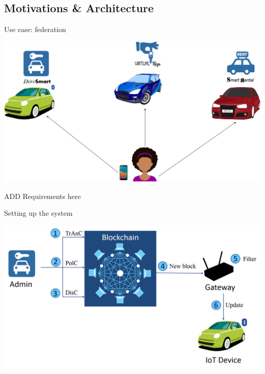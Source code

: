 \subsection{Motivations \& Architecture}

\begin{frame}{Use case: federation}
    \begin{center}
        \includegraphics[scale=0.36]{Figures/ex_MAAC-B.png}
    \end{center}
    ADD Requirements here
\end{frame}

\begin{frame}{Setting up the system}
    \begin{center}
        \includegraphics[scale=0.36]{Figures/MAAC-B_bootstrap.png}
    \end{center}
\end{frame}

